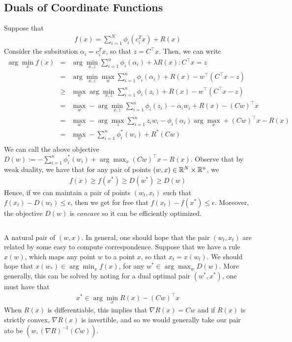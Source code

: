 \subsection{Duals of Coordinate Functions}
Suppose that 
\begin{eqnarray}
f(x) = \sum_{i=1}^N \phi_i(c_i^Tx) + R(x)
\end{eqnarray}
Consider the subsitution $\alpha_i = c_i^Tx$, so that $z = C^\top x$. Then, we can write 
\begin{eqnarray*}
\arg\min_{x}f(x) &=&  \arg\min_{x,z}  \sum_{i=1}^n \phi_i(\alpha_i) + \lambda R(x) : C^\top x = z \\
&=&  \arg\min_{x,z}  \max_{w} \sum_{i=1}^n \phi_i(\alpha_i) +  R(x) - w^{\top}(C^\top x - z ) \\
&\ge&   \max_{w} \arg\min_{x,z} \sum_{i=1}^n \phi_i(z_i) +  R(x) - w^{\top}(C^\top x - z ) \\
&=&   \max_{w} -\arg\min_{x,z} \sum_{i=1}^n \phi_i(z_i) - \alpha_iw_i + R(x) - (Cw)^{\top} x \\
&=&   \max_{w} -\arg\max_{z} \sum_{i=1}^n z_iw_i -  \phi_i(\alpha_i)  \arg\max_{x}+ (Cw)^{\top} x - R(x) \\
&=&   \max_{w} - \sum_{i=1}^n \phi_i^*(w_i) +  R^*(Cw) \\
\end{eqnarray*}
We can call the above objective $D(w):= - \sum_{i=1}^n \phi_i^*(w_i) +  \arg\max_{x} (Cw)^{\top} x - R(x)$. Observe that by weak duality, we have that for any pair of points $(w,x) \in \mathbb{R}^N \times \mathbb{R}^n$, we
\begin{eqnarray}
f(x) \ge f(x^*) \ge D(w^*) \ge D(w)
\end{eqnarray}
Hence, if we can maintain a pair of points $(w_t,x_t)$ such that $f(x_t) - D(w_t) \le \epsilon$, then we get for free that $f(x_t) - f(x^*) \le \epsilon$. Moreover, the objective $D(w)$ is \emph{concave} so it can be efficiently optimized.
\subsection{}
A natural pair of $(w,x)$. In general, one should hope that the pair $(w_t,x_t)$ are related by some easy to compute correspondence. Suppose that we have a rule $x(w)$, which maps any point $w$ to a point $x$, so that $x_t = x(w_t)$. We should hope that $x(w_*) \in \arg\min_{x} f(x)$, for any $w^* \in \arg\max_w D(w)$. More generally, this can be solved by noting for a dual optimal pair $(w^*,x^*)$, one must have that 
\begin{eqnarray}
x^* \in \arg\min_{x} R(x) - (Cw)^{\top}x
\end{eqnarray}
When $R(x)$ is differentiable, this implies that $\nabla R(x) = Cw$ and if $R(x)$ is strictly convex, $\nabla R(x)$ is invertible, and so we would generally take our pair ato be $(w,(\nabla R)^{-1}(Cw))$. 

